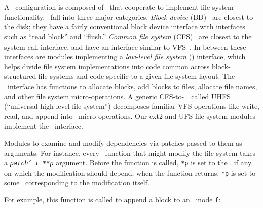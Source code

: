 
\section{\Modules}
\label{sec:modules}

A \Kudos\ configuration is composed of \modules\ that cooperate to
 implement file system functionality.
%
\Modules\ fall into three major categories.
%
\emph{Block device} (BD) \modules\ are closest to the disk; they have a fairly
conventional block device interface with interfaces such as ``read block'' and
``flush.''
%
\emph{Common file system} (CFS) \modules\ are closest to the system call
interface, and have an interface similar to VFS~\cite{kleiman86vnodes}. 
%
In between these interfaces are modules implementing a  \emph{low-level file
system} (\LFS) interface, which helps divide file system implementations
into code common across block-structured file systems and code specific to
a given file system layout.
%
The \LFS\ interface has functions to allocate blocks, add blocks to files,
allocate file names, and other file system micro-operations. 
A generic CFS-to-\LFS\ \module\ called UHFS
(``universal high-level file system'') decomposes familiar VFS operations
like write, read, and append into \LFS\ micro-operations. 
%
%
Our ext2 and UFS file system modules
implement the \LFS\ interface.


Modules to examine and modify dependencies via patches passed to them as
arguments.
%
For instance, every \LFS\ function that might modify the file system takes a
\texttt{\textit{patch\char`\_t **p}} argument.
%
Before the function is called, \texttt{*p} is set to the \patch,
if any, on which the modification should depend;
%
when the function returns, \texttt{*p} is set to some \patch\
corresponding to the modification itself.
%
\begin{comment}
(\Noop\ \patches\ allow this interface to generalize to multiple
dependencies.)
\end{comment}
%
For example, this function is called to append a block to an \LFS\ inode
\verb+f+:

